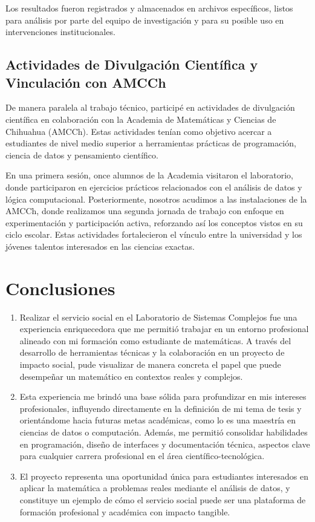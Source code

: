 \documentclass[10pt,a4paper]{report}
\begin{document}
\bigskip

Los resultados fueron registrados y almacenados en archivos específicos, listos para análisis por parte del equipo de investigación y para su posible uso en intervenciones institucionales.

\subsection{Actividades de Divulgación Científica y Vinculación con AMCCh}

De manera paralela al trabajo técnico, participé en actividades de divulgación científica en colaboración con la Academia de Matemáticas y Ciencias de Chihuahua (AMCCh). Estas actividades tenían como objetivo acercar a estudiantes de nivel medio superior a herramientas prácticas de programación, ciencia de datos y pensamiento científico.

\bigskip

En una primera sesión, once alumnos de la Academia visitaron el laboratorio, donde participaron en ejercicios prácticos relacionados con el análisis de datos y lógica computacional. Posteriormente, nosotros acudimos a las instalaciones de la AMCCh, donde realizamos una segunda jornada de trabajo con enfoque en experimentación y participación activa, reforzando así los conceptos vistos en su ciclo escolar. Estas actividades fortalecieron el vínculo entre la universidad y los jóvenes talentos interesados en las ciencias exactas.

\newpage

\section{Conclusiones}

\begin{enumerate}
\item Realizar el servicio social en el Laboratorio de Sistemas Complejos fue una experiencia enriquecedora que me permitió trabajar en un entorno profesional alineado con mi formación como estudiante de matemáticas. A través del desarrollo de herramientas técnicas y la colaboración en un proyecto de impacto social, pude visualizar de manera concreta el papel que puede desempeñar un matemático en contextos reales y complejos.
\item Esta experiencia me brindó una base sólida para profundizar en mis intereses profesionales, influyendo directamente en la definición de mi tema de tesis y orientándome hacia futuras metas académicas, como lo es una maestría en ciencias de datos o computación. Además, me permitió consolidar habilidades en programación, diseño de interfaces y documentación técnica, aspectos clave para cualquier carrera profesional en el área científico-tecnológica.
\item El proyecto representa una oportunidad única para estudiantes interesados en aplicar la matemática a problemas reales mediante el análisis de datos, y constituye un ejemplo de cómo el servicio social puede ser una plataforma de formación profesional y académica con impacto tangible.

\end{enumerate}
\end{document}
